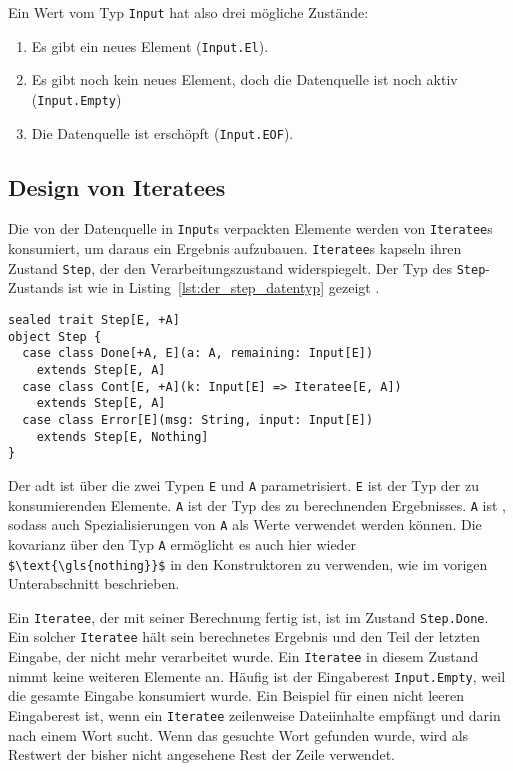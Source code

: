 Ein Wert vom Typ \lstinline|Input| hat also drei mögliche Zustände:
\begin{enumerate}
  \item Es gibt ein neues Element (\lstinline|Input.El|).
  \item Es gibt noch kein neues Element, doch die Datenquelle ist noch aktiv (\lstinline|Input.Empty|)
  \item Die Datenquelle ist erschöpft (\lstinline|Input.EOF|).
\end{enumerate}



\subsection{Design von Iteratees} %
\label{sub:design_iteratees}

Die von der Datenquelle in \lstinline|Input|s verpackten Elemente werden von \lstinline|Iteratee|s konsumiert, um daraus ein Ergebnis aufzubauen.
\lstinline|Iteratee|s kapseln ihren Zustand \lstinline|Step|, der den Verarbeitungszustand widerspiegelt.
Der Typ des \lstinline|Step|-Zustands ist wie in Listing~\ref{lst:der_step_datentyp} gezeigt \cite[vgl.][Z.~271]{play_iteratee_source_code}.
\begin{lstlisting}[caption=Der Step-Datentyp, label=lst:der_step_datentyp]
sealed trait Step[E, +A]
object Step {
  case class Done[+A, E](a: A, remaining: Input[E])
    extends Step[E, A]
  case class Cont[E, +A](k: Input[E] => Iteratee[E, A])
    extends Step[E, A]
  case class Error[E](msg: String, input: Input[E])
    extends Step[E, Nothing]
}
\end{lstlisting}

Der \gls{adt} ist über die zwei Typen \lstinline|E| und \lstinline|A| parametrisiert.
\lstinline|E| ist der Typ der zu konsumierenden Elemente.
\lstinline|A| ist der Typ des zu berechnenden Ergebnisses.
\lstinline|A| ist , sodass auch Spezialisierungen von \lstinline|A| als Werte verwendet werden können.
Die \gls{kovarianz} über den Typ \lstinline|A| ermöglicht es auch hier wieder \lstinline[mathescape]|$\text{\gls{nothing}}$| in den Konstruktoren zu verwenden, wie im vorigen Unterabschnitt beschrieben.

Ein \lstinline|Iteratee|, der mit seiner Berechnung fertig ist, ist im Zustand \lstinline|Step.Done|.
Ein solcher \lstinline|Iteratee| hält sein berechnetes Ergebnis und den Teil der letzten Eingabe, der nicht mehr verarbeitet wurde.
Ein \lstinline|Iteratee| in diesem Zustand nimmt keine weiteren Elemente an.
Häufig ist der Eingaberest \lstinline|Input.Empty|, weil die gesamte Eingabe konsumiert wurde.
Ein Beispiel für einen nicht leeren Eingaberest ist, wenn ein \lstinline|Iteratee| zeilenweise Dateiinhalte empfängt und darin nach einem Wort sucht.
Wenn das gesuchte Wort gefunden wurde, wird als Restwert der bisher nicht angesehene Rest der Zeile verwendet.

